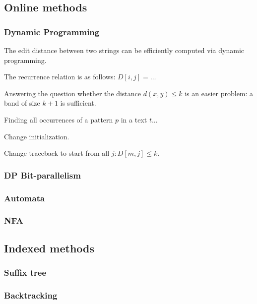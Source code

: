 
\subsection{Online methods}

\subsubsection{Dynamic Programming}

The edit distance between two strings can be efficiently computed via dynamic programming.

The recurrence relation is as follows: $D[i,j] = \dots$

Answering the question whether the distance $d(x,y) \leq k$ is an easier problem: a band of size $k+1$ is sufficient.

Finding all occurrences of a pattern $p$ in a text $t$...

Change initialization.

Change traceback to start from all $j : D[m,j] \leq k$.


\subsubsection{DP Bit-parallelism}


\subsubsection{Automata}

\subsubsection{NFA}



\subsection{Indexed methods}

\subsubsection{Suffix tree}

\subsubsection{Backtracking}

